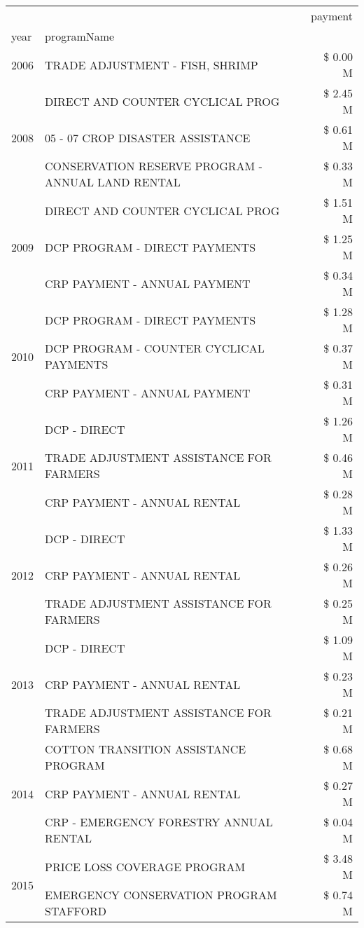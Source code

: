 \begin{tabular}{llr}
\toprule
 &  & payment \\
year & programName &  \\
\midrule
2006 & TRADE ADJUSTMENT - FISH, SHRIMP & \$ 0.00 M \\
\cline{1-3}
\multirow[t]{3}{*}{2008} & DIRECT AND COUNTER CYCLICAL PROG & \$ 2.45 M \\
 & 05 - 07 CROP DISASTER ASSISTANCE & \$ 0.61 M \\
 & CONSERVATION RESERVE PROGRAM - ANNUAL LAND RENTAL & \$ 0.33 M \\
\cline{1-3}
\multirow[t]{3}{*}{2009} & DIRECT AND COUNTER CYCLICAL PROG & \$ 1.51 M \\
 & DCP PROGRAM - DIRECT PAYMENTS & \$ 1.25 M \\
 & CRP PAYMENT - ANNUAL PAYMENT & \$ 0.34 M \\
\cline{1-3}
\multirow[t]{3}{*}{2010} & DCP PROGRAM - DIRECT PAYMENTS & \$ 1.28 M \\
 & DCP PROGRAM - COUNTER CYCLICAL PAYMENTS & \$ 0.37 M \\
 & CRP PAYMENT - ANNUAL PAYMENT & \$ 0.31 M \\
\cline{1-3}
\multirow[t]{3}{*}{2011} & DCP - DIRECT & \$ 1.26 M \\
 & TRADE ADJUSTMENT ASSISTANCE FOR FARMERS & \$ 0.46 M \\
 & CRP PAYMENT - ANNUAL RENTAL & \$ 0.28 M \\
\cline{1-3}
\multirow[t]{3}{*}{2012} & DCP - DIRECT & \$ 1.33 M \\
 & CRP PAYMENT - ANNUAL RENTAL & \$ 0.26 M \\
 & TRADE ADJUSTMENT ASSISTANCE FOR FARMERS & \$ 0.25 M \\
\cline{1-3}
\multirow[t]{3}{*}{2013} & DCP - DIRECT & \$ 1.09 M \\
 & CRP PAYMENT - ANNUAL RENTAL & \$ 0.23 M \\
 & TRADE ADJUSTMENT ASSISTANCE FOR FARMERS & \$ 0.21 M \\
\cline{1-3}
\multirow[t]{3}{*}{2014} & COTTON TRANSITION ASSISTANCE PROGRAM & \$ 0.68 M \\
 & CRP PAYMENT - ANNUAL RENTAL & \$ 0.27 M \\
 & CRP - EMERGENCY FORESTRY ANNUAL RENTAL & \$ 0.04 M \\
\cline{1-3}
\multirow[t]{3}{*}{2015} & PRICE LOSS COVERAGE PROGRAM & \$ 3.48 M \\
 & EMERGENCY CONSERVATION PROGRAM STAFFORD & \$ 0.74 M \\

\end{tabular}
